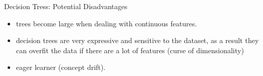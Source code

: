 \documentclass[xcolor={table}]{beamer}
\begin{document}
\begin{frame}
	\begin{block}{Decision Tress: Potential Disadvantages}
		\begin{itemize}
			\item trees become large when dealing with continuous features.
			\item decision trees are very expressive and sensitive to the dataset, as a result they can overfit the data if there are a lot of features (curse of dimensionality) 
			\item eager learner (concept drift). 
		\end{itemize}
	\end{block}
\end{frame}



\begin{frame}
	\tableofcontents
\end{frame}
\end{document}
